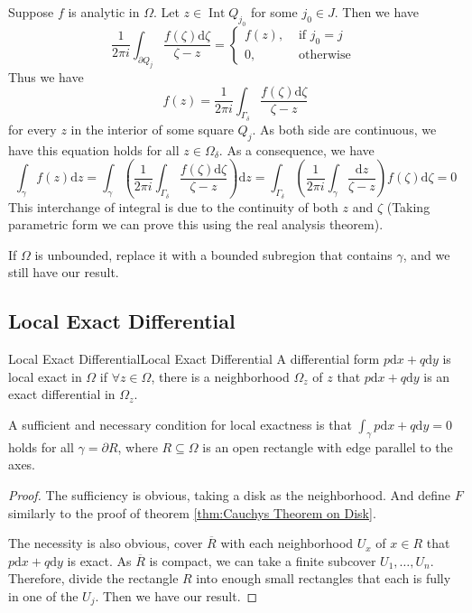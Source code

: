 \documentclass[../main.tex]{subfiles}
\begin{document}
Suppose $f$ is analytic in $\Omega$. Let $z\in \operatorname{Int} Q_{j_0}$ for some $j_0\in J$. Then we have
\begin{equation*}
	\frac{1}{2 \pi i} \int_{\partial Q_j} \frac{f(\zeta) \mathrm{d} \zeta}{\zeta-z} = 
	\begin{cases}
		f(z), &\text{ if } j_0=j\\
		0, & \text{ otherwise }
	\end{cases}
\end{equation*}
Thus we have
\begin{equation*}
	f(z) = \frac{1}{2 \pi i} \int_{\Gamma_{\delta}} \frac{f(\zeta)\mathrm{d} \zeta}{\zeta-z}
\end{equation*}
for every $z$ in the interior of some square $Q_j$. As both side are continuous, we have this equation holds for all $z\in \Omega_{\delta}$. As a consequence, we have
\begin{equation*}
\int_{\gamma}f(z) \mathrm{d} z = \int_{\gamma} \left(\frac{1}{2 \pi i} \int_{\Gamma_{\delta}} \frac{f(\zeta)\mathrm{d} \zeta}{\zeta-z}\right) \mathrm{d} z = \int_{\Gamma_{\delta}}\left(\frac{1}{2 \pi i}\int_{\gamma} \frac{\mathrm{d} z}{\zeta - z}\right) f(\zeta) \mathrm{d} \zeta = 0
\end{equation*}
This interchange of integral is due to the continuity of both $z$ and $\zeta$ (Taking parametric form we can prove this using the real analysis theorem).

If $\Omega$ is unbounded, replace it with a bounded subregion that contains $\gamma$, and we still have our result.

\subsection{Local Exact Differential}

\begin{definition}{Local Exact Differential}{Local Exact Differential}
	A differential form $p \mathrm{d} x+q \mathrm{d} y$ is local exact in $\Omega$ if $\forall z\in \Omega$, there is a neighborhood $\Omega_z$ of $z$ that $p \mathrm{d} x + q \mathrm{d} y$ is an exact differential in $\Omega_z$.
\end{definition}

A sufficient and necessary condition for local exactness is that $\displaystyle \int_{\gamma} p \mathrm{d} x + q \mathrm{d} y=0$ holds for all $\gamma = \partial R$, where $R \subseteq \Omega$ is an open rectangle with edge parallel to the axes.
\begin{proof}
	The sufficiency is obvious, taking a disk as the neighborhood. And define $F$ similarly to the proof of theorem \ref{thm:Cauchys Theorem on Disk}.
	
	The necessity is also obvious, cover $\overline{R}$ with each neighborhood $U_x$ of $x\in R$ that $p \mathrm{d} x + q \mathrm{d} y$ is exact. As $\overline{R}$ is compact, we can take a finite subcover $U_1, \ldots ,U_n$. Therefore, divide the rectangle $R$ into enough small rectangles that each is fully in one of the $U_j$. Then we have our result.
\end{proof}
\end{document}
